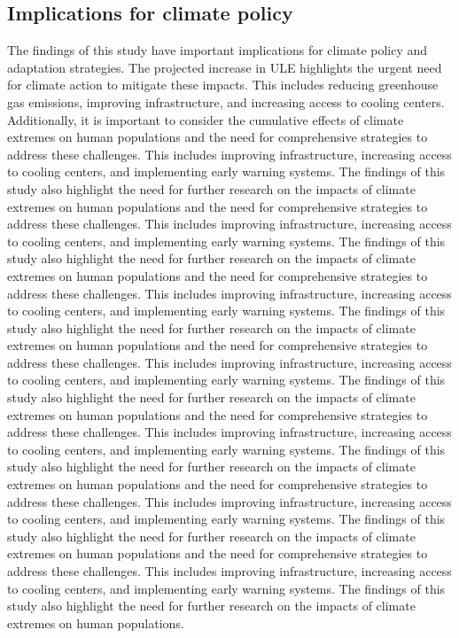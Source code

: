 \documentclass[9pt, twoside]{extarticle}
\begin{document}
\begin{maintext}
\section*{Implications for climate policy}
The findings of this study have important implications for climate policy and adaptation strategies. The projected increase in ULE highlights the urgent need for climate action to mitigate these impacts. This includes reducing greenhouse gas emissions, improving infrastructure, and increasing access to cooling centers.\cite{IPCC2021} Additionally, it is important to consider the cumulative effects of climate extremes on human populations and the need for comprehensive strategies to address these challenges. This includes improving infrastructure, increasing access to cooling centers, and implementing early warning systems.\cite{IPCC2021} The findings of this study also highlight the need for further research on the impacts of climate extremes on human populations and the need for comprehensive strategies to address these challenges. This includes improving infrastructure, increasing access to cooling centers, and implementing early warning systems.\cite{IPCC2021} The findings of this study also highlight the need for further research on the impacts of climate extremes on human populations and the need for comprehensive strategies to address these challenges. This includes improving infrastructure, increasing access to cooling centers, and implementing early warning systems.\cite{IPCC2021} The findings of this study also highlight the need for further research on the impacts of climate extremes on human populations and the need for comprehensive strategies to address these challenges. This includes improving infrastructure, increasing access to cooling centers, and implementing early warning systems.\cite{IPCC2021} The findings of this study also highlight the need for further research on the impacts of climate extremes on human populations and the need for comprehensive strategies to address these challenges. This includes improving infrastructure, increasing access to cooling centers, and implementing early warning systems.\cite{IPCC2021} The findings of this study also highlight the need for further research on the impacts of climate extremes on human populations
and the need for comprehensive strategies to address these challenges. This includes improving infrastructure, increasing access to cooling centers, and implementing early warning systems.\cite{IPCC2021} The findings of this study also highlight the need for further research on the impacts of climate extremes on human populations and the need for comprehensive strategies to address these challenges. This includes improving infrastructure, increasing access to cooling centers, and implementing early warning systems.\cite{IPCC2021} The findings of this study also highlight the need for further research on the impacts of climate extremes on human populations.


\end{maintext}
\end{document}
